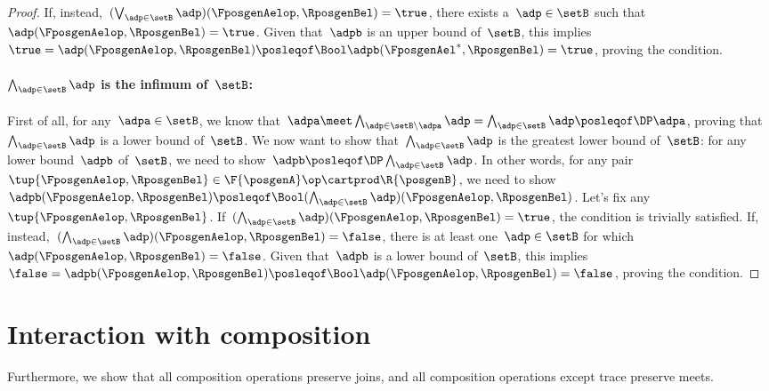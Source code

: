 \begin{proof}
    If, instead,~$(\bigvee_{\adp \in \setB} \adp)(\FposgenAelop,\RposgenBel)=\true$, there exists a~$\adp\in \setB$ such that~$\adp(\FposgenAelop,\RposgenBel)=\true$.
    Given that~$\adpb$ is an upper bound of~$\setB$, this implies~$\true=\adp(\FposgenAelop,\RposgenBel)\posleqof\Bool \adpb(\FposgenAel^*,\RposgenBel)=\true$, proving the condition.

    \paragraph*{$\bigwedge_{\adp \in \setB} \adp$ is the infimum of~$\setB$:}
    First of all, for any~$\adpa\in \setB$, we know that~$\adpa \meet \bigwedge_{\adp \in \setB \backslash \adpa} \adp= \bigwedge_{\adp \in \setB} \adp \posleqof\DP \adpa$, proving that~$\bigwedge_{\adp \in \setB} \adp$ is a lower bound of~$\setB$.
    We now want to show that~$\bigwedge_{\adp \in \setB} \adp$ is the greatest lower bound of~$\setB$: for any lower bound~$\adpb$ of~$\setB$, we need to show~$\adpb\posleqof\DP\bigwedge_{\adp \in \setB} \adp $.
    In other words, for any pair~$\tup{\FposgenAelop,\RposgenBel}\in \F{\posgenA}\op\cartprod \R{\posgenB}$, we need to show~$\adpb(\FposgenAelop,\RposgenBel) \posleqof\Bool (\bigwedge_{\adp \in \setB} \adp)(\FposgenAelop,\RposgenBel)$.
    Let's fix any~$\tup{\FposgenAelop,\RposgenBel}$.
    If~$(\bigwedge_{\adp \in \setB} \adp)(\FposgenAelop,\RposgenBel)=\true$, the condition is trivially satisfied.
    If, instead,~$(\bigwedge_{\adp \in \setB} \adp)(\FposgenAelop,\RposgenBel)=\false$, there is at least one~$\adp\in \setB$ for which~$\adp(\FposgenAelop,\RposgenBel)=\false$.
    Given that~$\adpb$ is a lower bound of~$\setB$, this implies~$\false=\adpb(\FposgenAelop,\RposgenBel)\posleqof\Bool \adp(\FposgenAelop,\RposgenBel)=\false$, proving the condition.
\end{proof}

\section{Interaction with composition}
Furthermore, we show that all composition operations preserve joins, and all composition operations except trace preserve meets.

